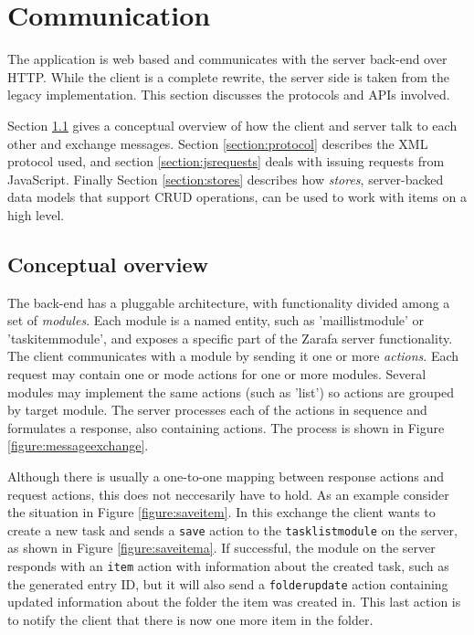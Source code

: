 \chapter{Communication}
\label{section:communication}

The application is web based and communicates with the server back-end over HTTP. While the client is
a complete rewrite, the server side is taken from the legacy implementation. This section discusses
the protocols and APIs involved.

Section \ref{section:commoverview} gives a conceptual overview of how the client and server talk to 
each other and exchange messages. Section \ref{section:protocol} describes the XML protocol used, 
and section \ref{section:jsrequests} deals with issuing requests from JavaScript. Finally Section
\ref{section:stores} describes how \emph{stores}, server-backed data models that support CRUD 
operations, can be used to work with items on a high level.

\section{Conceptual overview}
\label{section:commoverview}

The back-end has a pluggable architecture, with functionality divided among a set of \emph{modules}.
Each module is a named entity, such as 'maillistmodule' or 'taskitemmodule', and exposes a specific
part of the Zarafa server functionality. The client communicates with a module by sending it one or 
more \emph{actions}. Each request may contain one or mode actions for one or more modules. Several 
modules may implement the same actions (such as 'list') so actions are grouped by target module.
The server processes each of the actions in sequence and formulates a response, also containing 
actions. The process is shown in Figure \ref{figure:messageexchange}. 

Although there is usually a one-to-one mapping between response actions and request actions, this does 
not neccesarily have to hold. As an example consider the situation in Figure \ref{figure:saveitem}.
In this exchange the client wants to create a new task and sends a {\tt save} action to the
{\tt tasklistmodule} on the server, as shown in Figure \ref{figure:saveitema}. If successful, the
module on the server responds with an {\tt item} action with information about the created task, such
as the generated entry ID, but it will also send a {\tt folderupdate} action containing updated 
information about the folder the item was created in. This last action is to notify the client that
there is now one more item in the folder. 

